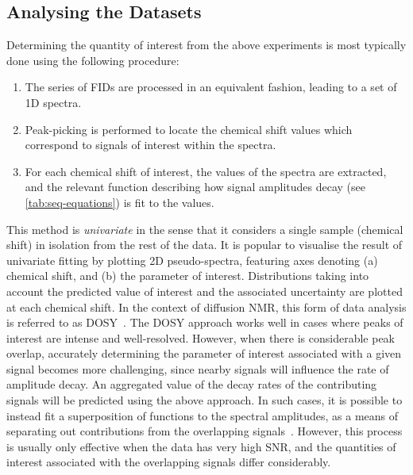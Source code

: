 \subsection{Analysing the Datasets}
Determining the quantity of interest from the above experiments is most
typically done using the following procedure:
\begin{enumerate}
    \item The series of \acp{FID} are processed in an equivalent fashion,
        leading to a set of \ac{1D} spectra.
    \item Peak-picking is performed to locate the chemical shift values which
        correspond to signals of interest within the spectra.
    \item For each chemical shift of interest, the values of the spectra are
        extracted, and the relevant function describing how signal amplitudes
        decay (see \cref{tab:seq-equations}) is fit to the values.
\end{enumerate}
This method is \emph{univariate} in the sense that it considers a single sample
(chemical shift) in isolation from the rest of the data.
It is popular to visualise the result of univariate fitting by plotting \ac{2D}
pseudo-spectra, featuring axes denoting (a) chemical shift, and (b)
the parameter of interest. Distributions taking
into account the predicted value of interest and the associated uncertainty
are plotted at each chemical shift.
In the context of diffusion \ac{NMR}, this form of data analysis is
referred to as \ac{DOSY}~\cite{Morris2009b}.
The \ac{DOSY} approach works well in cases where peaks of interest are intense
and well-resolved. However, when there is considerable peak overlap, accurately
determining the parameter of interest associated with a given signal becomes
more challenging, since nearby signals will influence the rate of amplitude
decay. An aggregated value of the decay rates of the contributing signals
will be predicted using the above approach.
In such cases, it is possible to instead fit
a superposition of functions to the spectral amplitudes, as a means of
separating out contributions from the overlapping signals~\cite{Nilsson2006}.
However, this process is usually only effective when the data has very high
\ac{SNR}, and the quantities of interest associated with the overlapping
signals differ considerably.


